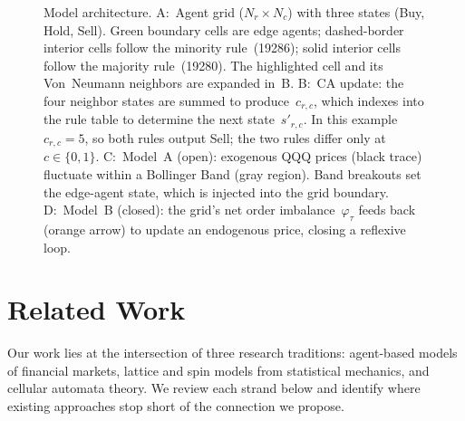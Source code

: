 \documentclass{article}
\theoremstyle{definition}
\theoremstyle{remark}
\begin{document}
\begin{figure}[tb]
\caption{Model architecture. A:~Agent grid ($N_r \times N_c$) with three states
(Buy, Hold, Sell). Green boundary cells are edge agents; dashed-border interior cells
follow the minority rule~(19286); solid interior cells follow the majority
rule~(19280). The highlighted cell and its Von~Neumann neighbors are expanded in~B.
B:~CA update: the four neighbor states are summed to produce~$c_{r,c}$, which indexes
into the rule table to determine the next state~$s'_{r,c}$. In this example
$c_{r,c}=5$, so both rules output Sell; the two rules differ only at
$c \in \{0,1\}$.
C:~Model~A (open): exogenous QQQ prices (black trace) fluctuate within a Bollinger
Band (gray region). Band breakouts set the edge-agent state, which is injected into
the grid boundary.
D:~Model~B (closed): the grid's net order imbalance~$\varphi_\tau$ feeds back
(orange arrow) to update an endogenous price, closing a reflexive loop.}
\label{fig:schematic}
\end{figure}


\section{Related Work}
\label{sec:related}

Our work lies at the intersection of three research traditions: agent-based models of
financial markets, lattice and spin models from statistical mechanics, and cellular
automata theory. We review each strand below and identify where existing approaches
stop short of the connection we propose.
\end{document}
